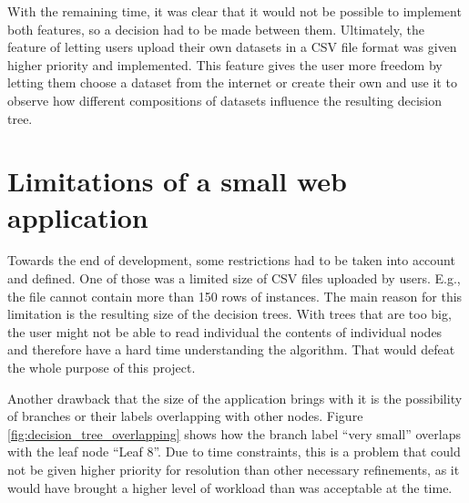 With the remaining time, it was clear that it would not be possible to implement both features, so a decision had to be made between them. Ultimately, the feature of letting users upload their own datasets in a CSV file format was given higher priority and implemented. This feature gives the user more freedom by letting them choose a dataset from the internet or create their own and use it to observe how different compositions of datasets influence the resulting decision tree.

\section{Limitations of a small web application} \label{limitations_small_app}
Towards the end of development, some restrictions had to be taken into account and defined. One of those was a limited size of CSV files uploaded by users. E.g., the file cannot contain more than 150 rows of instances. The main reason for this limitation is the resulting size of the decision trees. With trees that are too big, the user might not be able to read individual the contents of individual nodes and therefore have a hard time understanding the algorithm. That would defeat the whole purpose of this project.

Another drawback that the size of the application brings with it is the possibility of branches or their labels overlapping with other nodes. Figure \ref{fig:decision_tree_overlapping} shows how the branch label ``very small'' overlaps with the leaf node ``Leaf 8''.
Due to time constraints, this is a problem that could not be given higher priority for resolution than other necessary refinements, as it would have brought a higher level of workload than was acceptable at the time.